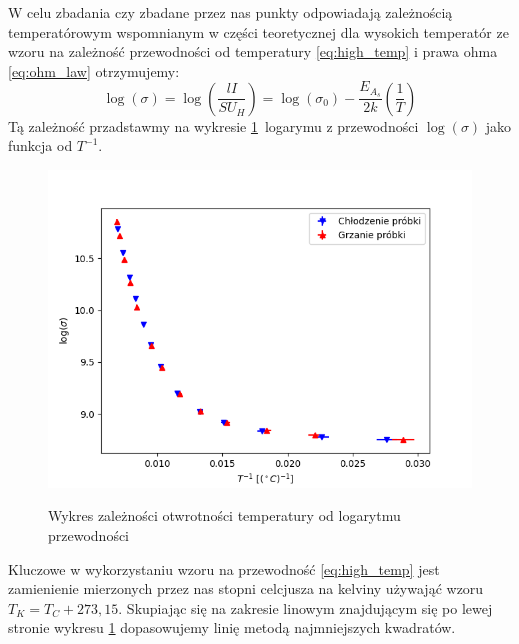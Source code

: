 \documentclass[12pt]{article}
\begin{document}
W celu zbadania czy zbadane przez nas punkty odpowiadają zależnością temperatórowym wspomnianym w części teoretycznej dla wysokich temperatór ze wzoru na zależność przewodności od temperatury \ref{eq:high_temp} i prawa ohma \ref{eq:ohm_law} otrzymujemy:
\begin{equation}
    \log(\sigma) = \log(\frac{lI}{SU_H}) = \log(\sigma_0)-\frac{E_{A_s}}{2k}(\frac{1}{T})
\end{equation}
Tą zależność przadstawmy na wykresie \ref{fig:temp_conductivity} logarymu z przewodności $\log(\sigma)$ jako funkcja od $T^{-1}$. 
\begin{figure}[H]
    \centering
    \includegraphics[scale=0.5]{temp_cond}
    \label{fig:temp_conductivity}
    \caption{Wykres zależności otwrotności temperatury od logarytmu przewodności}
\end{figure}
Kluczowe w wykorzystaniu wzoru na przewodność \ref{eq:high_temp} jest zamienienie mierzonych przez nas stopni celcjusza na kelviny używająć wzoru $T_K = T_C + 273{,}15$\cite{kelvins}.
Skupiając się na zakresie linowym znajdującym się po lewej stronie wykresu \ref{fig:temp_conductivity} dopasowujemy linię metodą najmniejszych kwadratów.
\end{document}
